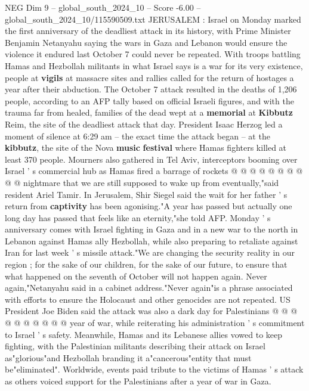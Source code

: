 \begin{textsample}{NEG Dim 9 – global\_south\_2024\_10 – Score -6.00 – global\_south\_2024\_10/115590509.txt}  \label{ex:f9_neg_274}
JERUSALEM : Israel on Monday marked the first anniversary of the deadliest attack in its history, with Prime Minister Benjamin Netanyahu saying the wars in Gaza and Lebanon would ensure the violence it endured last October 7 could never be repeated.
With troops battling Hamas and Hezbollah militants in what Israel says is a war for its very existence, people at \textbf{vigils} at massacre sites and rallies called for the return of hostages a year after their abduction.
The October 7 attack resulted in the deaths of 1,206 people, according to an AFP tally based on official Israeli figures, and with the trauma far from healed, families of the dead wept at a \textbf{memorial} at \textbf{Kibbutz} Reim, the site of the deadliest attack that day.
President Isaac Herzog led a moment of silence at 6:29 am -- the exact time the attack began -- at the \textbf{kibbutz}, the site of the Nova \textbf{music} \textbf{festival} where Hamas fighters killed at least 370 people.
Mourners also gathered in Tel Aviv, interceptors booming over Israel ' s commercial hub as Hamas fired a barrage of rockets @ @ @ @ @ @ @ @ @ @ nightmare that we are still supposed to wake up from eventually,"said resident Ariel Tamir.
In Jerusalem, Shir Siegel said the wait for her father ' s return from \textbf{captivity} has been agonising."A year has passed but actually one long day has passed that feels like an eternity,"she told AFP.
Monday ' s anniversary comes with Israel fighting in Gaza and in a new war to the north in Lebanon against Hamas ally Hezbollah, while also preparing to retaliate against Iran for last week ' s missile attack."We are changing the security reality in our region ; for the sake of our children, for the sake of our future, to ensure that what happened on the seventh of October will not happen again.
Never again,"Netanyahu said in a cabinet address."Never again"is a phrase associated with efforts to ensure the Holocaust and other genocides are not repeated.
US President Joe Biden said the attack was also a dark day for Palestinians @ @ @ @ @ @ @ @ @ @ year of war, while reiterating his administration ' s commitment to Israel ' s safety.
Meanwhile, Hamas and its Lebanese allies vowed to keep fighting, with the Palestinian militants describing their attack on Israel as"glorious"and Hezbollah branding it a"cancerous"entity that must be"eliminated".
Worldwide, events paid tribute to the victims of Hamas ' s attack as others voiced support for the Palestinians after a year of war in Gaza.

\end{textsample}
